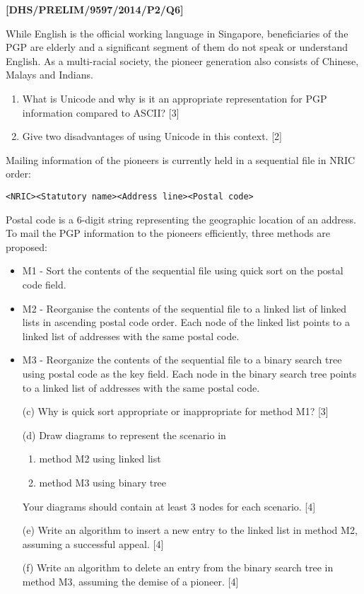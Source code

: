 \item \textbf{{[}DHS/PRELIM/9597/2014/P2/Q6{]} }

While English is the official working language in Singapore, beneficiaries
of the PGP are elderly and a significant segment of them do not speak
or understand English. As a multi-racial society, the pioneer generation
also consists of Chinese, Malays and Indians. 
\begin{enumerate}
\item What is Unicode and why is it an appropriate representation for PGP
information compared to ASCII? \hfill{}{[}3{]}
\item Give two disadvantages of using Unicode in this context. \hfill{}
{[}2{]}
\end{enumerate}
Mailing information of the pioneers is currently held in a sequential
file in NRIC order: 
\noindent \begin{center}
\texttt{<NRIC><Statutory name><Address line><Postal code> }
\par\end{center}

Postal code is a 6-digit string representing the geographic location
of an address. To mail the PGP information to the pioneers efficiently,
three methods are proposed: 
\begin{itemize}
\item M1 - Sort the contents of the sequential file using quick sort on
the postal code field. 
\item M2 - Reorganise the contents of the sequential file to a linked list
of linked lists in ascending postal code order. Each node of the linked
list points to a linked list of addresses with the same postal code. 
\item M3 - Reorganize the contents of the sequential file to a binary search
tree using postal code as the key field. Each node in the binary search
tree points to a linked list of addresses with the same postal code. 
\end{itemize}
\begin{enumerate}
\item[(c)]  Why is quick sort appropriate or inappropriate for method M1? \hfill{}{[}3{]}
\item[(d)]  Draw diagrams to represent the scenario in 
\begin{enumerate}
\item method M2 using linked list 
\item method M3 using binary tree 
\end{enumerate}
Your diagrams should contain at least 3 nodes for each scenario. \hfill{}
{[}4{]}
\item[(e)]  Write an algorithm to insert a new entry to the linked list in method
M2, assuming a successful appeal. \hfill{} {[}4{]}
\item[(f)]  Write an algorithm to delete an entry from the binary search tree
in method M3, assuming the demise of a pioneer. \hfill{}{[}4{]}
\end{enumerate}